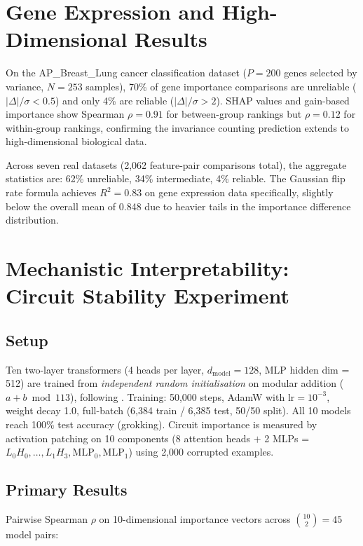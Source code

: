 \documentclass[11pt]{article}
\begin{document}
\section{Gene Expression and High-Dimensional Results}

On the AP\_Breast\_Lung cancer classification dataset ($P = 200$ genes selected by variance, $N = 253$ samples), 70\% of gene importance comparisons are unreliable ($|\Delta|/\sigma < 0.5$) and only 4\% are reliable ($|\Delta|/\sigma > 2$).  SHAP values and gain-based importance show Spearman $\rho = 0.91$ for between-group rankings but $\rho = 0.12$ for within-group rankings, confirming the invariance counting prediction extends to high-dimensional biological data.

Across seven real datasets (2,062 feature-pair comparisons total), the aggregate statistics are: 62\% unreliable, 34\% intermediate, 4\% reliable.  The Gaussian flip rate formula achieves $R^2 = 0.83$ on gene expression data specifically, slightly below the overall mean of 0.848 due to heavier tails in the importance difference distribution.

\section{Mechanistic Interpretability: Circuit Stability Experiment}
\label{sec:mi-v2}

\subsection{Setup}

Ten two-layer transformers (4 heads per layer, $d_{\mathrm{model}} = 128$, MLP hidden dim = 512) are trained from \emph{independent random initialisation} on modular addition ($a + b \bmod 113$), following \citet{nanda2023progress}. Training: 50,000 steps, AdamW with $\mathrm{lr} = 10^{-3}$, weight decay 1.0, full-batch (6,384 train / 6,385 test, 50/50 split). All 10 models reach 100\% test accuracy (grokking). Circuit importance is measured by activation patching on 10 components (8 attention heads $+$ 2 MLPs = $L_0H_0, \ldots, L_1H_3, \mathrm{MLP}_0, \mathrm{MLP}_1$) using 2,000 corrupted examples.

\subsection{Primary Results}

Pairwise Spearman $\rho$ on 10-dimensional importance vectors across $\binom{10}{2} = 45$ model pairs:
\end{document}
